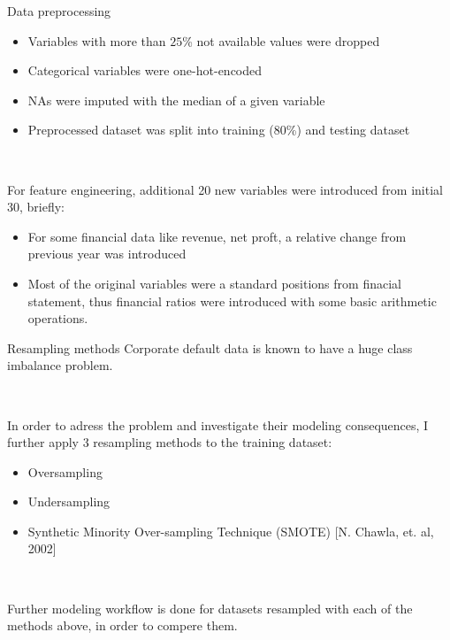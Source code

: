 \documentclass{beamer}
\begin{document}
\begin{frame}{Data preprocessing}

\begin{itemize}
\item Variables with more than $25$\% not available values were dropped
\item Categorical variables were one-hot-encoded
\item NAs were imputed with the median of a given variable
\item Preprocessed dataset was split into training (80\%) and testing dataset 

\end{itemize}

\

For feature engineering, additional 20 new variables were introduced from initial 30, briefly:

\begin{itemize}
\item For some financial data like revenue, net proft, a relative change from previous year was introduced
\item Most of the original variables were a standard positions from finacial statement, thus financial ratios were introduced with some basic arithmetic operations.

\end{itemize} 

\end{frame}

\begin{frame}{Resampling methods}
Corporate default data is known to have a huge class imbalance problem. 

\

In order to adress the problem and investigate their modeling consequences, I further apply 3 resampling methods to the training dataset:

\begin{itemize}
\item Oversampling
\item Undersampling
\item Synthetic Minority Over-sampling Technique (SMOTE) [N. Chawla, et. al, 2002]
\end{itemize}

\

Further modeling workflow is done for datasets resampled with each of the methods above, in order to compere them.
\end{frame}
\end{document}
